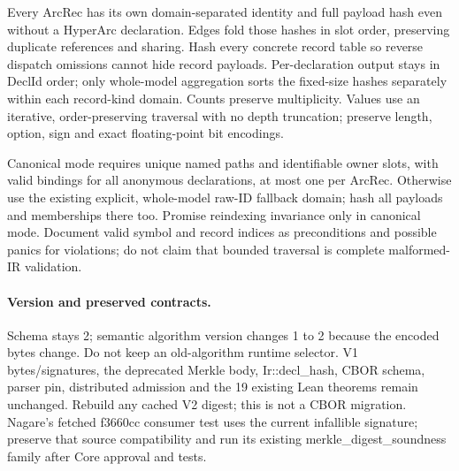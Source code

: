 \documentclass[11pt,a4paper]{article}
\begin{document}
Every ArcRec has its own domain-separated identity and full payload hash even
without a HyperArc declaration. Edges fold those hashes in slot order, preserving
duplicate references and sharing. Hash every concrete record table so reverse
dispatch omissions cannot hide record payloads. Per-declaration output stays in
DeclId order; only whole-model aggregation sorts the fixed-size hashes separately
within each record-kind domain. Counts preserve multiplicity. Values use an
iterative, order-preserving traversal with no depth truncation; preserve length,
option, sign and exact floating-point bit encodings.

Canonical mode requires unique named paths and identifiable owner slots, with
valid bindings for all anonymous declarations, at most one per ArcRec.
Otherwise use the existing explicit,
whole-model raw-ID fallback domain; hash all payloads and memberships there too.
Promise reindexing invariance only in canonical mode. Document valid symbol and
record indices as preconditions and possible panics for violations; do not claim
that bounded traversal is complete malformed-IR validation.

\paragraph{Version and preserved contracts.}
Schema stays 2; semantic algorithm version changes 1 to 2 because the encoded
bytes change. Do not keep an old-algorithm runtime selector. V1 bytes/signatures,
the deprecated Merkle body, Ir::decl\_hash, CBOR schema, parser pin, distributed
admission and the 19 existing Lean theorems remain unchanged. Rebuild any cached
V2 digest; this is not a CBOR migration. Nagare's fetched f3660cc consumer test
uses the current infallible signature; preserve that source compatibility and
run its existing merkle\_digest\_soundness family after Core approval and tests.
\end{document}
